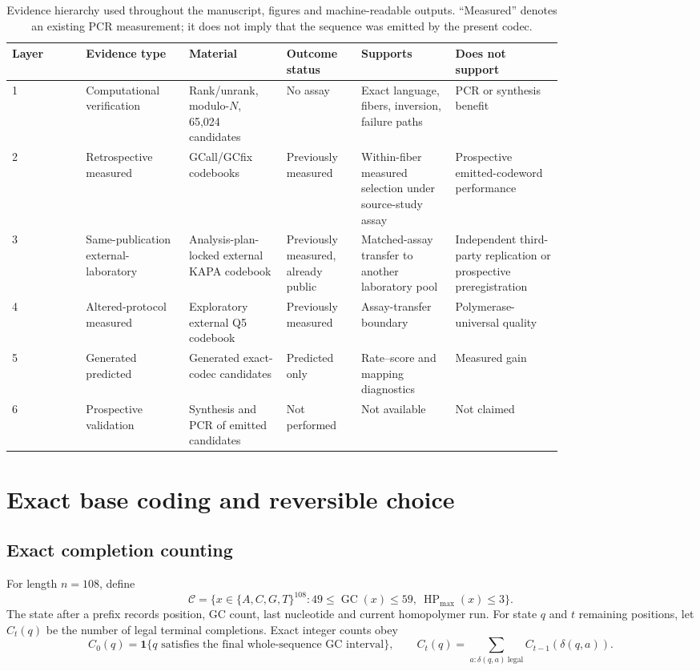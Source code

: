 \documentclass[10pt]{article}
\newcommand{\DNA}{\{A,C,G,T\}}
\begin{document}
\begin{table}[H]
\centering
\scriptsize
\begin{tabular}{@{}p{0.11\linewidth}p{0.15\linewidth}p{0.14\linewidth}p{0.10\linewidth}p{0.14\linewidth}p{0.16\linewidth}@{}}
\toprule
Layer & Evidence type & Material & Outcome status & Supports & Does not support\\
\midrule
1 & Computational verification & Rank/unrank, modulo-$N$, 65,024 candidates & No assay & Exact language, fibers, inversion, failure paths & PCR or synthesis benefit\\
2 & Retrospective measured & GCall/GCfix codebooks & Previously measured & Within-fiber measured selection under source-study assay & Prospective emitted-codeword performance\\
3 & Same-publication external-laboratory & Analysis-plan-locked external KAPA codebook & Previously measured, already public & Matched-assay transfer to another laboratory pool & Independent third-party replication or prospective preregistration\\
4 & Altered-protocol measured & Exploratory external Q5 codebook & Previously measured & Assay-transfer boundary & Polymerase-universal quality\\
5 & Generated predicted & Generated exact-codec candidates & Predicted only & Rate--score and mapping diagnostics & Measured gain\\
6 & Prospective validation & Synthesis and PCR of emitted candidates & Not performed & Not available & Not claimed\\
\bottomrule
\end{tabular}
\caption{Evidence hierarchy used throughout the manuscript, figures and machine-readable outputs. ``Measured'' denotes an existing PCR measurement; it does not imply that the sequence was emitted by the present codec.}
\label{tab:s-evidence-hierarchy}
\end{table}

\section{Exact base coding and reversible choice}

\subsection{Exact completion counting}

For length $n=108$, define
\[
 \mathcal C=\{x\in\DNA^{108}:49\leq \operatorname{GC}(x)\leq59,
 \ \operatorname{HP}_{\max}(x)\leq3\}.
\]
The state after a prefix records position, GC count, last nucleotide and current homopolymer run. For state $q$ and $t$ remaining positions, let $C_t(q)$ be the number of legal terminal completions. Exact integer counts obey
\[
 C_0(q)=\mathbf 1\{q\text{ satisfies the final whole-sequence GC interval}\},\qquad
 C_t(q)=\sum_{a:\delta(q,a)\ \mathrm{legal}} C_{t-1}(\delta(q,a)).
\]
\end{document}
